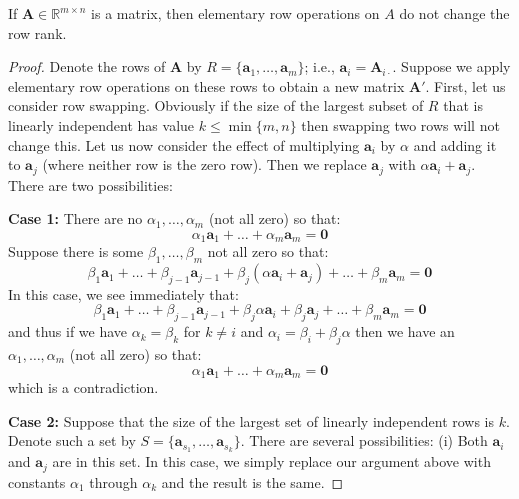 \begin{theorem}If $\mathbf{A} \in \mathbb{R}^{m \times n}$ is a matrix, then elementary row operations on $A$ do not change the row rank.
\end{theorem}
\begin{proof} Denote the rows of $\mathbf{A}$ by $R = \{\mathbf{a}_1, \dots, \mathbf{a}_m\}$; i.e., $\mathbf{a}_i = \mathbf{A}_{i\cdot}$. Suppose we apply elementary row operations on these rows to obtain a new matrix $\mathbf{A}'$. First, let us consider row swapping. Obviously if the size of the largest subset of $R$ that is linearly independent has value $k \leq \min\{m,n\}$ then swapping two rows will not change this. Let us now consider the effect of multiplying $\mathbf{a}_i$ by $\alpha$ and adding it to $\mathbf{a}_j$ (where neither row is the zero row). Then we replace $\mathbf{a}_j$ with $\alpha\mathbf{a}_i + \mathbf{a}_j$. There are two possibilities: 

\textbf{Case 1:} 
There are no $\alpha_1,\dots,\alpha_m$ (not all zero) so that:
\begin{displaymath}
\alpha_1\mathbf{a}_1 + \dots + \alpha_m\mathbf{a}_m = \mathbf{0}
\end{displaymath}
Suppose there is some $\beta_1,\dots,\beta_m$ not all zero so that:
\begin{displaymath}
\beta_1\mathbf{a}_1 + \dots + \beta_{j-1}\mathbf{a}_{j-1} + \beta_{j}\left( \alpha\mathbf{a}_i + \mathbf{a}_j\right) + \dots + \beta_{m}\mathbf{a}_m = \mathbf{0}
\end{displaymath}
In this case, we see immediately that:
\begin{displaymath}
\beta_1\mathbf{a}_1 + \dots + \beta_{j-1}\mathbf{a}_{j-1} + \beta_j\alpha\mathbf{a}_i + \beta_j\mathbf{a}_j + \dots + \beta_{m}\mathbf{a}_m = \mathbf{0}
\end{displaymath}
and thus if we have $\alpha_k = \beta_k$ for $k \neq i$ and $\alpha_i = \beta_i + \beta_j\alpha$ then we have an $\alpha_1,\dots,\alpha_m$ (not all zero) so that:
\begin{displaymath}
\alpha_1\mathbf{a}_1 + \dots + \alpha_m\mathbf{a}_m = \mathbf{0}
\end{displaymath}
which is a contradiction.

\textbf{Case 2:} Suppose that the size of the largest set of linearly independent rows is $k$. Denote such a set by $S = \{\mathbf{a}_{s_1},\dots,\mathbf{a}_{s_k}\}$. There are several possibilities: (i) Both $\mathbf{a}_i$ and $\mathbf{a}_j$ are in this set. In this case, we simply replace our argument above with constants $\alpha_1$ through $\alpha_k$ and the result is the same.


\end{proof}
